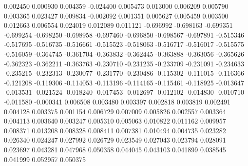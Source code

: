 0.002450
0.000930
0.004359
-0.024400
0.005473
0.013000
0.006209
0.005790
0.003365
0.023427
0.009834
-0.002092
0.001351
0.005627
0.005459
0.003500
0.012663
0.006554
0.024019
0.012089
0.011121
-0.696992
-0.698163
-0.699351
-0.699254
-0.698250
-0.698958
-0.697460
-0.696850
-0.698567
-0.697891
-0.515346
-0.517695
-0.516735
-0.516661
-0.515523
-0.518063
-0.516717
-0.516017
-0.515575
-0.516059
-0.364745
-0.361704
-0.363832
-0.362445
-0.363888
-0.363056
-0.365626
-0.362323
-0.362211
-0.363763
-0.230710
-0.231235
-0.233709
-0.231091
-0.234633
-0.235215
-0.232313
-0.230077
-0.231770
-0.230486
-0.115302
-0.111015
-0.116366
-0.121208
-0.119306
-0.114053
-0.113196
-0.114165
-0.115461
-0.118925
-0.013647
-0.013531
-0.021524
-0.018240
-0.017453
-0.012697
-0.012102
-0.014830
-0.010710
-0.011580
-0.000341
0.006508
0.003480
0.003397
0.002818
0.003819
0.002491
0.004128
0.003375
0.001154
0.006729
0.007009
0.005826
0.002557
0.003364
0.004113
0.003640
0.003247
0.005310
0.005063
0.010822
0.011162
0.009957
0.008371
0.013208
0.008328
0.008411
0.007381
0.010494
0.004735
0.023282
0.026340
0.024247
0.027992
0.026729
0.023549
0.027043
0.023794
0.028091
0.023697
0.043281
0.047968
0.050358
0.044045
0.043103
0.041899
0.038545
0.041999
0.052957
0.050375
